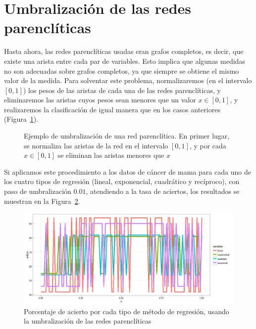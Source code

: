\section{Umbralización de las redes parenclíticas}

Hasta ahora, las redes parenclíticas usadas eran grafos completos, es decir, que existe una arista entre cada par de variables. Esto implica que algunas medidas no son adecuadas sobre grafos completos, ya que siempre se obtiene el mismo valor de la medida. Para solventar este problema, normalizaremos (en el intervalo $[0,1]$) los pesos de las aristas de cada una de las redes parenclíticas, y eliminaremos las aristas cuyos pesos sean menores que un valor $x \in [0,1]$, y realizaremos la clasificación de igual manera que en los casos anteriores (Figura~\ref{fig:ejemploumbralizacion}).


\begin{figure}[tbph!]
	\centering
	\ejemploumbralizacion
	\caption{Ejemplo de umbralización de una red parenclítica. En primer lugar, se normaliza las aristas de la red en el intervalo $[0,1]$, y por cada $x \in [0,1]$ se eliminan las aristas menores que $x$}
	\label{fig:ejemploumbralizacion}
\end{figure}

Si aplicamos este procedimiento a los datos de cáncer de mama para cada uno de los cuatro tipos de regresión (lineal, exponencial, cuadrático y recíproco), con paso de umbralización $0.01$, atendiendo a la tasa de aciertos, los resultados se muestran en la Figura~\ref{fig:umbralizacion}.\\

\begin{figure}[tbph!]
	\centering
	\includegraphics[width=1\linewidth]{imagenes/cancer/umbralizacion.png}
	\caption{Porcentaje de acierto por cada tipo de método de regresión, usando la umbralización de las redes parenclíticas}
	\label{fig:umbralizacion}
\end{figure}

